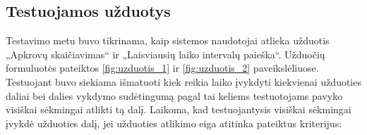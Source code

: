 


\subsection{Testuojamos užduotys}

Testavimo metu buvo tikrinama, kaip sistemos naudotojai atlieka
užduotis „Apkrovų skaičiavimas“ ir „Laisviausių laiko
intervalų paieška“. Užduočių formuluotės pateiktos
\ref{fig:uzduotis_1} ir \ref{fig:uzduotis_2} paveikslėliuose.
Testuojant buvo siekiama išmatuoti kiek reikia laiko įvykdyti
kiekvienai užduoties daliai bei dalies vykdymo sudėtingumą pagal tai
keliems testuotojams pavyko visiškai sėkmingai atlikti tą dalį.
Laikoma, kad testuojantysis visiškai sėkmingai įvykdė užduoties dalį,
jei užduoties atlikimo eiga atitinka pateiktus kriterijus:

